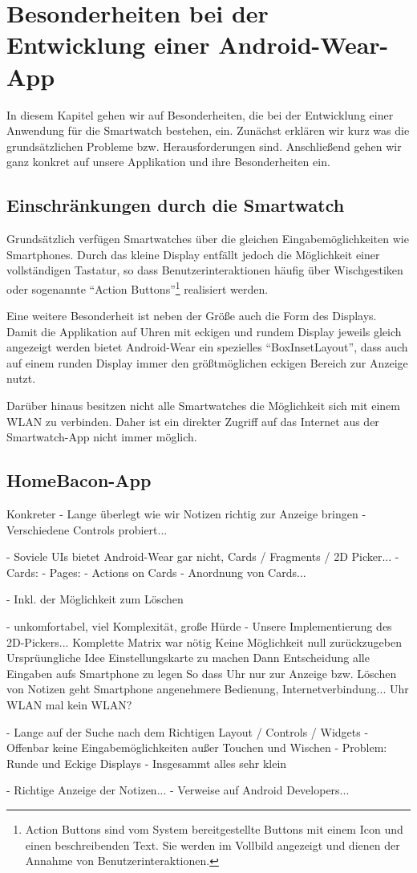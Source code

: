 \section{Besonderheiten bei der Entwicklung einer Android-Wear-App}
In diesem Kapitel gehen wir auf Besonderheiten, die bei der Entwicklung einer Anwendung für die Smartwatch bestehen, ein. Zunächst erklären wir kurz was die grundsätzlichen Probleme bzw. Herausforderungen sind. Anschließend gehen wir ganz konkret auf unsere Applikation und ihre Besonderheiten ein.

\subsection{Einschränkungen durch die Smartwatch}
Grundsätzlich verfügen Smartwatches über die gleichen Eingabemöglichkeiten wie Smartphones. Durch das kleine Display entfällt jedoch die Möglichkeit einer vollständigen Tastatur, so dass Benutzerinteraktionen häufig über Wischgestiken oder sogenannte "`Action Buttons"'\footnote{Action Buttons sind vom System bereitgestellte Buttons mit einem Icon und einen beschreibenden Text. Sie werden im Vollbild angezeigt und dienen der Annahme von Benutzerinteraktionen.} realisiert werden. 

Eine weitere Besonderheit ist neben der Größe auch die Form des Displays. Damit die Applikation auf Uhren mit eckigen und rundem Display jeweils gleich angezeigt werden bietet Android-Wear ein spezielles "`BoxInsetLayout"', dass auch auf einem runden Display immer den größtmöglichen eckigen Bereich zur Anzeige nutzt.

Darüber hinaus besitzen nicht alle Smartwatches die Möglichkeit sich mit einem WLAN zu verbinden. Daher ist ein direkter Zugriff auf das Internet aus der Smartwatch-App nicht immer möglich.

\subsection{HomeBacon-App}


Konkreter
	- Lange überlegt wie wir Notizen richtig zur Anzeige bringen
	- Verschiedene Controls probiert...
	
	- Soviele UIs bietet Android-Wear gar nicht, Cards / Fragments / 2D Picker...
		- Cards: 
		- Pages: 
		- Actions on Cards
		- Anordnung von Cards...
	
		- Inkl. der Möglichkeit zum Löschen
	
	- unkomfortabel, viel Komplexität, große Hürde
	- Unsere Implementierung des 2D-Pickers...
		Komplette Matrix war nötig
		Keine Möglichkeit null zurückzugeben
		Ursprüungliche Idee Einstellungskarte zu machen
		Dann Entscheidung alle Eingaben aufs Smartphone zu legen
		So dass Uhr nur zur Anzeige bzw. Löschen von Notizen geht
		Smartphone angenehmere Bedienung, Internetverbindung... Uhr WLAN mal kein WLAN?

- Lange auf der Suche nach dem Richtigen Layout / Controls / Widgets
- Offenbar keine Eingabemöglichkeiten außer Touchen und Wischen
- Problem: Runde und Eckige Displays
- Insgesammt alles sehr klein

- Richtige Anzeige der Notizen...
- Verweise auf Android Developers...